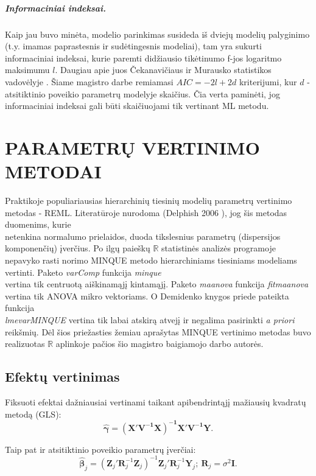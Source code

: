 \documentclass[12pt,a4paper]{article}
\newcommand{\R}{{\mathbb R}}
\begin{document}
\subparagraph{Informaciniai indeksai.} Kaip jau buvo minėta, modelio parinkimas susideda iš dviejų modelių palyginimo (t.y. imamas paprastesnis ir sudėtingesnis modeliai), tam yra sukurti informaciniai indeksai, kurie paremti didžiausio tikėtinumo f-jos logaritmo maksimumu $l$. Daugiau apie juos Čekanavičiaus ir Murausko statistikos vadovėlyje \cite{cek}. Šiame magistro darbe remiamasi $AIC=-2l+2d$ kriterijumi, kur $d$ - atsitiktinio poveikio parametrų modelyje skaičius. Čia verta paminėti, jog informaciniai indeksai gali būti skaičiuojami tik vertinant ML metodu.

\newpage
\section{PARAMETRŲ VERTINIMO METODAI} \label{sec:vert}
\indent Praktikoje populiariausias hierarchinių tiesinių modelių parametrų vertinimo metodas - REML. Literatūroje nurodoma (Delphish 2006 \cite{delpish}), jog šis metodas duomenims, kurie\\ netenkina normalumo prielaidos, duoda tikslesnius parametrų (dispersijos komponenčių) įverčius. Po ilgų paieškų $\R$ statistinės analizės programoje nepavyko rasti norimo MINQUE metodo hierarchiniams tiesiniams modeliams vertinti. Paketo \textit{varComp} funkcija \textit{minque}\\ vertina tik centruotą aiškinamąjį kintamąjį. Paketo \textit{maanova} funkcija \textit{fitmaanova} vertina tik ANOVA mikro vektoriams. O Demidenko knygos \cite{mixedR} priede pateikta funkcija\\ \textit{lmevarMINQUE} vertina tik labai atskirą atvejį ir negalima pasirinkti \textit{a priori} reikšmių. Dėl šios priežasties žemiau aprašytas MINQUE vertinimo metodas buvo realizuotas $\R$ aplinkoje pačios šio magistro baigiamojo darbo autorės.

\subsection{Efektų vertinimas}
\indent Fiksuoti efektai dažniausiai vertinami taikant apibendrintąjį mažiausių kvadratų metodą (GLS):
\begin{equation}\label{eq:gamma}
\boldsymbol{\hat{\gamma}}=\mathbf{\left(X'V^{-1}X\right)^{-1}X'V^{-1}Y}.
\end{equation}

Taip pat ir atsitiktinio poveikio parametrų įverčiai:
\begin{equation} \label{eq:beta}
\boldsymbol{\hat{\beta}}_j=\left(\mathbf{Z}_j'\mathbf{R}^{-1}_j\mathbf{Z}_j\right)^{-1}\mathbf{Z}_j'\mathbf{R}^{-1}_j\mathbf{Y}_j;\ \mathbf{R}_j=\sigma^2\mathbf{I}.
\end{equation}
\end{document}
